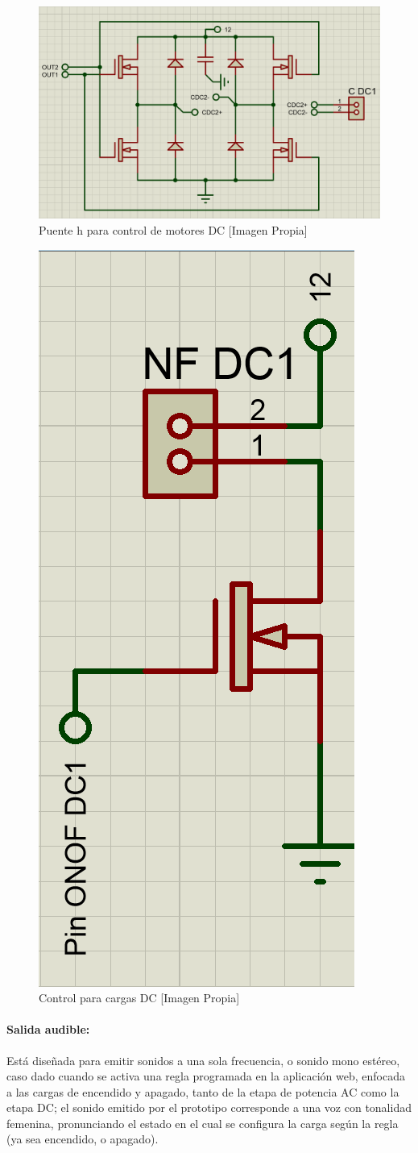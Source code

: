 		\begin{figure}[H]
			\centering
			\caption{Puente h para control de motores DC [Imagen Propia]}
			\label{fig:CDC}
			\includegraphics[width=0.7\linewidth]{Imagenes/CDC}
		\end{figure}
	
		\begin{figure}[H]
			\centering
			\caption{Control para cargas DC [Imagen Propia]}
			\label{fig:ONOFDC}
			\includegraphics[width=0.25\linewidth]{Imagenes/ONOFDC}
		\end{figure}
	
	\paragraph{Salida audible:}
		Está diseñada para emitir sonidos a una sola frecuencia, o sonido mono estéreo, caso dado cuando se activa una regla programada en la aplicación web, enfocada a las cargas de encendido y apagado, tanto de la etapa de potencia AC como la etapa DC; el sonido emitido por el prototipo corresponde a una voz con tonalidad femenina, pronunciando el estado en el cual se configura la carga según la regla (ya sea encendido, o apagado).\\
		
